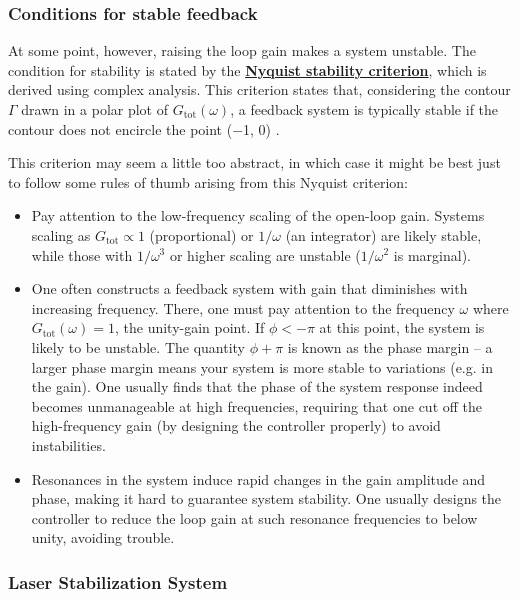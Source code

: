 \documentclass{../lab}
\begin{document}
\subsubsection{Conditions for stable feedback}

At some point, however, raising the loop gain makes a system unstable. The condition for stability is stated by the \href{https://berkeley-physics111b.github.io/assets/pdf/oldwebsitestructure/Definitions\%20for\%20MOT.pdf}{\textbf{Nyquist stability criterion}}, which is derived using complex analysis. This criterion states that, considering the contour $\Gamma$ drawn in a polar plot of $G_\text{tot}(\omega)$, a feedback system is typically stable if the contour does not encircle the point ($-$1, 0) \cite{PreciseCriterion}.

This criterion may seem a little too abstract, in which case it might be best just to follow some rules of thumb arising from this Nyquist criterion:

\begin{itemize}
    \item Pay attention to the low-frequency scaling of the open-loop gain. Systems scaling as $G_\text{tot}\propto 1$ (proportional) or $1/\omega$ (an integrator) are likely stable, while those with $1/\omega^3$ or higher scaling are unstable ($1/\omega^2$ is marginal).

    \item One often constructs a feedback system with gain that diminishes with increasing frequency. There, one must pay attention to the frequency $\omega$ where $ G_\text{tot}(\omega) = 1$, the unity-gain point. If $\phi < -\pi$ at this point, the system is likely to be unstable. The quantity $\phi + \pi$ is known as the phase margin – a larger phase margin means your system is more stable to variations (e.g. in the gain). One usually finds that the phase of the system response indeed becomes unmanageable at high frequencies, requiring that one cut off the high-frequency gain (by designing the controller properly) to avoid instabilities.

    \item Resonances in the system induce rapid changes in the gain amplitude and phase, making it hard to guarantee system stability. One usually designs the controller to reduce the loop gain at such resonance frequencies to below unity, avoiding trouble.
\end{itemize}

\subsubsection{Laser Stabilization System}
\end{document}
